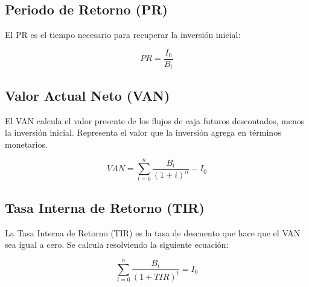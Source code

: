 \documentclass[conference,12pt]{IEEEtran}
\begin{document}
\begin{Form}
\subsection{Periodo de Retorno (PR)}

El PR es el tiempo  necesario para recuperar la inversión inicial:

$$
PR=\frac{I_0}{B_t}
$$

\subsection{Valor Actual Neto (VAN)}

El VAN calcula el valor presente de los flujos de caja futuros descontados, menos la inversión inicial. Representa el valor que la inversión agrega en términos monetarios.

$$
VAN = \sum_{t=0}^{n} \frac{B_t}{(1+i)^n} - I_0
$$








\subsection{Tasa Interna de Retorno (TIR)}

La Tasa Interna de Retorno (TIR) es la tasa de descuento que hace que el VAN sea igual a cero. Se calcula resolviendo la siguiente ecuación:

$$
    \sum_{t=0}^{n} \frac{B_t}{(1+TIR)^t} = I_0
$$




\begin{figure}[H]
        \centering
\end{figure}
\end{Form}
\end{document}
